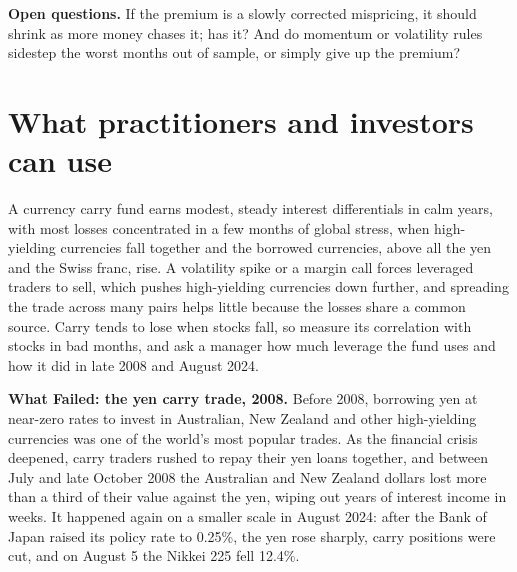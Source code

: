 \label{sec:06-open}
\textbf{Open questions.} If the premium is a slowly corrected mispricing, it should shrink as more money chases it; has it? And do momentum or volatility rules sidestep the worst months out of sample, or simply give up the premium?

\section{What practitioners and investors can use}
\label{sec:06-investors}

A currency carry fund earns modest, steady interest differentials in calm years, with most losses concentrated in a few months of global stress, when high-yielding currencies fall together and the borrowed currencies, above all the yen and the Swiss franc, rise. A volatility spike or a margin call forces leveraged traders to sell, which pushes high-yielding currencies down further, and spreading the trade across many pairs helps little because the losses share a common source. Carry tends to lose when stocks fall, so measure its correlation with stocks in bad months, and ask a manager how much leverage the fund uses and how it did in late 2008 and August 2024.

\begin{callout}
\textbf{What Failed: the yen carry trade, 2008.} Before 2008, borrowing yen at near-zero rates to invest in Australian, New Zealand and other high-yielding currencies was one of the world's most popular trades. As the financial crisis deepened, carry traders rushed to repay their yen loans together, and between July and late October 2008 the Australian and New Zealand dollars lost more than a third of their value against the yen, wiping out years of interest income in weeks. It happened again on a smaller scale in August 2024: after the Bank of Japan raised its policy rate to 0.25\%, the yen rose sharply, carry positions were cut, and on August 5 the Nikkei 225 fell 12.4\%.
\end{callout}
